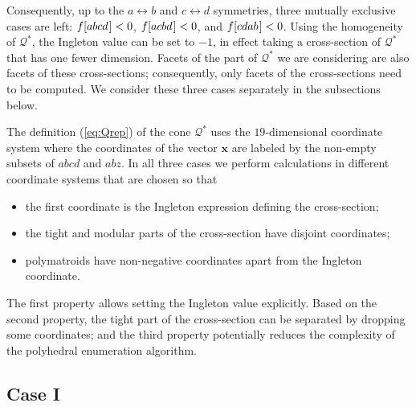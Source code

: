 \documentclass[reqno]{amsart}
\theoremstyle{definition}
\newcommand\tsp{\mkern 1.5mu}
\def\abcd{[abcd\tsp]}
\def\acbd{[acbd\tsp]}
\def\cdab{[cdab\tsp]}
\newcommand\blabel[1]{\hypertarget{#1}{}}
\begin{document}
Consequently, up to the $a\leftrightarrow b$ and $c\leftrightarrow d$
symmetries, three mutually exclusive cases are left: $f\abcd <0$,
$f\acbd<0$, and $f\cdab<0$. Using the homogeneity of $\mathcal Q^*$, the
Ingleton value can be set to $-1$, in effect taking a cross-section of
$\mathcal Q^*$ that has one fewer dimension. Facets of the part of $\mathcal
Q^*$ we are considering are also facets of these cross-sections;
consequently, only facets of the cross-sections need to be computed. We
consider these three cases separately in the subsections below.

The definition (\ref{eq:Qrep}) of the cone $\mathcal Q^*$ uses the
$19$-dimensional coordinate system where the coordinates of the vector
$\mathbf x$ are labeled by the non-empty subsets of $abcd$ and $abz$. In all
three cases we perform calculations in different coordinate systems that are
chosen so that
\begin{itemize}
\item the first coordinate is the Ingleton expression defining the
cross-section;
\item the tight and modular parts of the cross-section have disjoint
coordinates;
\item polymatroids have non-negative coordinates apart from the 
Ingleton coordinate.
\end{itemize}
The first property allows setting the Ingleton value explicitly. Based on
the second property, the tight part of the cross-section can be separated by
dropping some coordinates; and the third property potentially reduces the
complexity of the polyhedral enumeration algorithm.

\subsection{Case I}\label{subsec:c1}\blabel{subsec:c1}
\end{document}
